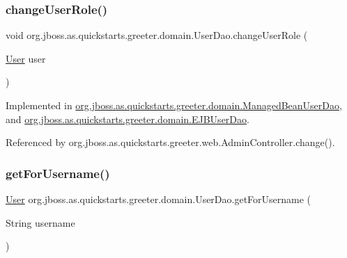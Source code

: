 \subsubsection{\texorpdfstring{change\+User\+Role()}{changeUserRole()}}
{\footnotesize\ttfamily void org.\+jboss.\+as.\+quickstarts.\+greeter.\+domain.\+User\+Dao.\+change\+User\+Role (\begin{DoxyParamCaption}\item[{\hyperlink{classorg_1_1jboss_1_1as_1_1quickstarts_1_1greeter_1_1domain_1_1_user}{User}}]{user }\end{DoxyParamCaption})}



Implemented in \hyperlink{classorg_1_1jboss_1_1as_1_1quickstarts_1_1greeter_1_1domain_1_1_managed_bean_user_dao_aefa42ba41f80108e41cdcb5cfb53520f}{org.\+jboss.\+as.\+quickstarts.\+greeter.\+domain.\+Managed\+Bean\+User\+Dao}, and \hyperlink{classorg_1_1jboss_1_1as_1_1quickstarts_1_1greeter_1_1domain_1_1_e_j_b_user_dao_a42c366e895e01ef3e8afa36b750c3068}{org.\+jboss.\+as.\+quickstarts.\+greeter.\+domain.\+E\+J\+B\+User\+Dao}.



Referenced by org.\+jboss.\+as.\+quickstarts.\+greeter.\+web.\+Admin\+Controller.\+change().

\mbox{\label{interfaceorg_1_1jboss_1_1as_1_1quickstarts_1_1greeter_1_1domain_1_1_user_dao_a84aa70bdb1523236fcc24d2cd8b02b9f}} 
\subsubsection{\texorpdfstring{get\+For\+Username()}{getForUsername()}}
{\footnotesize\ttfamily \hyperlink{classorg_1_1jboss_1_1as_1_1quickstarts_1_1greeter_1_1domain_1_1_user}{User} org.\+jboss.\+as.\+quickstarts.\+greeter.\+domain.\+User\+Dao.\+get\+For\+Username (\begin{DoxyParamCaption}\item[{String}]{username }\end{DoxyParamCaption})}



